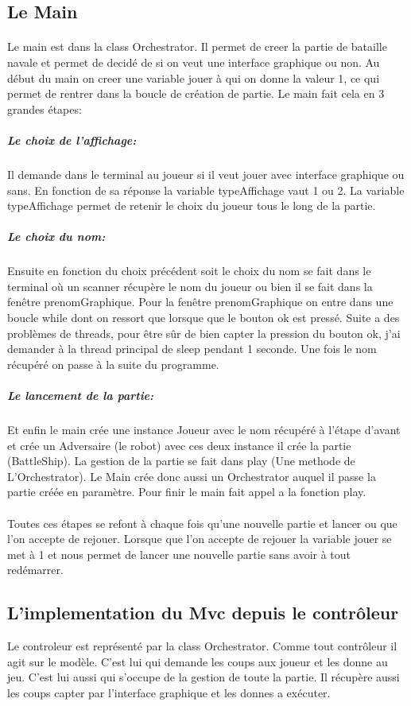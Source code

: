 \documentclass[a4paper,12pt]{article} %
\begin{document}
\subsection{Le Main}
\paragraph{} Le main est dans la class Orchestrator. Il permet de creer la partie de bataille navale et permet de decidé de si on veut une interface graphique ou non. Au début du main on creer une variable jouer à qui on donne la valeur 1, ce qui permet de rentrer dans la boucle de création de partie. Le main fait cela en 3 grandes étapes:
\subparagraph{Le choix de l'affichage:}
Il demande dans le terminal au joueur si il veut jouer avec interface graphique ou sans. En fonction de sa réponse la variable typeAffichage vaut 1 ou 2. La variable typeAffichage permet de retenir le choix du joueur tous le long de la partie.
\subparagraph{Le choix du nom:}\label{affichage}
Ensuite en fonction du choix précédent soit le choix du nom se fait dans le terminal où un scanner récupère le nom du joueur ou bien il se fait dans la fenêtre prenomGraphique. Pour la fenêtre prenomGraphique on entre dans une boucle while dont on ressort que lorsque que le bouton ok est pressé. Suite a des problèmes de threads, pour être sûr de bien capter la pression du bouton ok, j'ai demander à la thread principal de sleep pendant 1 seconde. Une fois le nom récupéré on passe à la suite du programme.
\subparagraph{Le lancement de la partie:}
Et enfin le main crée une instance Joueur avec le nom récupéré à l'étape d'avant et crée un Adversaire (le robot) avec ces deux instance il crée la partie (BattleShip). La gestion de la partie se fait dans play (Une methode de L'Orchestrator). Le Main crée donc aussi un Orchestrator auquel il passe la partie créée en paramètre. Pour finir le main fait appel a la fonction play.
\paragraph{}
Toutes ces étapes se refont à chaque fois qu'une nouvelle partie et lancer ou que l'on accepte de rejouer. Lorsque que l'on accepte de rejouer la variable jouer se met à 1 et nous permet de lancer une nouvelle partie sans avoir à tout redémarrer.
\subsection{L'implementation du Mvc depuis le contrôleur}
Le controleur est représenté par la class Orchestrator. Comme tout contrôleur il agit sur le modèle. C'est lui qui demande les coups aux joueur et les donne au jeu. C'est lui aussi qui s'occupe de la gestion de toute la partie. Il récupère aussi les coups capter par l'interface graphique et les donnes a exécuter.
\end{document}
